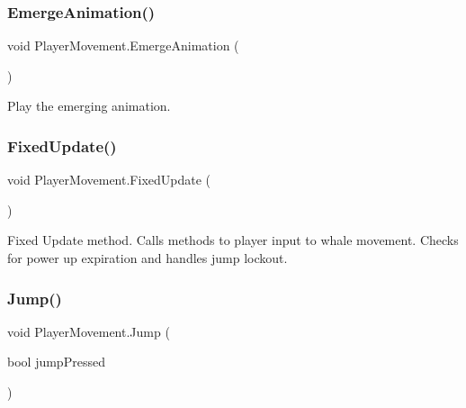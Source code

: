 \mbox{\label{class_player_movement_ae0190d96bfed446e24e623ef87a7788a}} 
\subsubsection{\texorpdfstring{Emerge\+Animation()}{EmergeAnimation()}}
{\footnotesize\ttfamily void Player\+Movement.\+Emerge\+Animation (\begin{DoxyParamCaption}{ }\end{DoxyParamCaption})\hspace{0.3cm}{\ttfamily [private]}}



Play the emerging animation. 

\mbox{\label{class_player_movement_a0caaa871b9ef680c9f02bd0e22c77db1}} 
\subsubsection{\texorpdfstring{Fixed\+Update()}{FixedUpdate()}}
{\footnotesize\ttfamily void Player\+Movement.\+Fixed\+Update (\begin{DoxyParamCaption}{ }\end{DoxyParamCaption})\hspace{0.3cm}{\ttfamily [private]}}



Fixed Update method. Calls methods to player input to whale movement. Checks for power up expiration and handles jump lockout. 

\mbox{\label{class_player_movement_ae0738f125df9382e2425be64619cbf4a}} 
\subsubsection{\texorpdfstring{Jump()}{Jump()}}
{\footnotesize\ttfamily void Player\+Movement.\+Jump (\begin{DoxyParamCaption}\item[{bool}]{jump\+Pressed }\end{DoxyParamCaption})}



